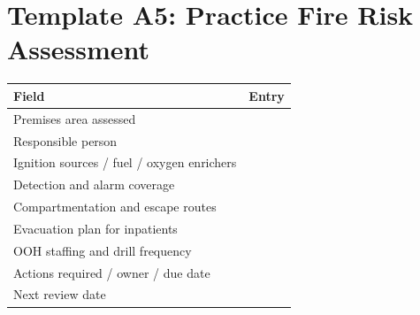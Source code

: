 \section{Template A5: Practice Fire Risk Assessment}
\begin{tabularx}{\textwidth}{>{\raggedright\arraybackslash}p{4.3cm}X}
\toprule
Field & Entry \\
\midrule
Premises area assessed & \\
Responsible person & \\
Ignition sources / fuel / oxygen enrichers & \\
Detection and alarm coverage & \\
Compartmentation and escape routes & \\
Evacuation plan for inpatients & \\
OOH staffing and drill frequency & \\
Actions required / owner / due date & \\
Next review date & \\
\bottomrule
\end{tabularx}
